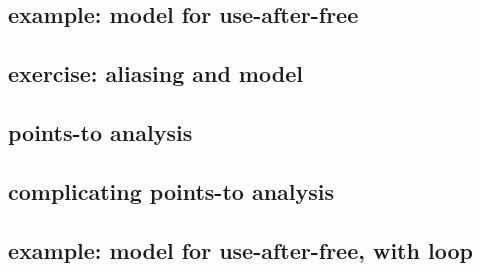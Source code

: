 
\subsection{example: model for use-after-free}


\subsection{exercise: aliasing and model}


\subsection{points-to analysis}

\subsection{complicating points-to analysis}


\subsection{example: model for use-after-free, with loop}

